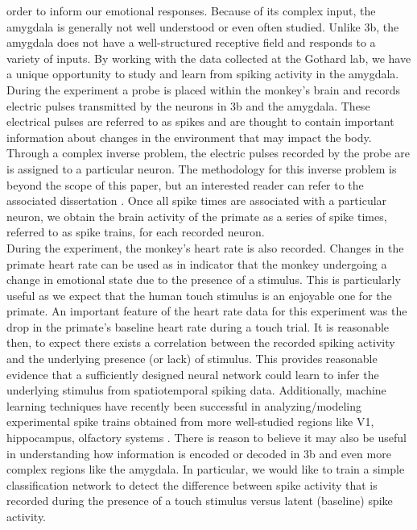 \documentclass[12pt]{article}
\begin{document}
order to inform our emotional responses. Because of its complex input, the amygdala is generally not well understood or even often studied. Unlike 3b, the amygdala does not have a well-structured receptive field and responds to a variety of inputs. By working with the data collected at the Gothard lab, we have a unique opportunity to study and learn from spiking activity in the amygdala. \\
\indent During the experiment a probe is placed within the monkey's brain and records electric pulses transmitted by the neurons in 3b and the amygdala. These electrical pulses are referred to as spikes and are thought to contain important information about changes in the environment that may impact the body.  Through a complex inverse problem, the electric pulses recorded by the probe are is assigned to a particular
neuron. The methodology for this inverse problem is beyond the scope of this paper,
but an interested reader can refer to the associated dissertation \cite{greene}. Once all spike
times are associated with a particular neuron, we obtain the brain activity of the primate
as a series of spike times, referred to as spike trains, for each recorded neuron.  \\
\indent During the experiment, the monkey's heart rate is also recorded. Changes in the primate heart rate can be used as in indicator that the monkey undergoing a change in emotional state due to the presence of a stimulus. This is particularly useful as we expect that the human touch stimulus is an enjoyable one for the primate. An important feature of the heart rate data for this experiment was the drop in the primate's baseline heart rate during a touch trial. It is reasonable then, to expect there exists a correlation between the recorded spiking activity and the underlying presence (or lack) of stimulus. This provides reasonable evidence that a sufficiently designed neural network could learn to infer the underlying stimulus from spatiotemporal spiking data. Additionally, machine learning techniques have recently been successful in analyzing/modeling experimental spike trains obtained from more well-studied regions like V1, hippocampus, olfactory systems \cite{laza,banino,stevens}. There is reason to believe it may also be useful in understanding how information is encoded or decoded in 3b and even more complex regions like the amygdala. In particular, we would like to train a simple classification network to detect the difference between spike activity that is recorded during the presence of a touch stimulus versus latent (baseline) spike activity. \\
\end{document}
